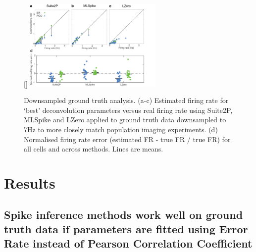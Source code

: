 \documentclass[a4paper,10pt,twocolumn]{article}
\begin{document}
\begin{figure}
[\FBwidth]
{\includegraphics[trim={0 0 25 0},clip,width=0.6\textwidth]{full_figs/why_deconvolve_F1_2.png}}
{\caption{Downsampled ground truth analysis. (a-c) Estimated firing rate for `best' deconvolution parameters versus real firing rate using Suite2P, MLSpike and LZero applied to ground truth data downsampled to 7Hz to more closely match population imaging experiments. (d) Normalised firing rate error (estimated FR - true FR / true FR) for all cells and across methods. Lines are means. 
\label{fig:GT_data_ds}}}
\end{figure}



\section{Results} 
\subsection{Spike inference methods work well on ground truth data if parameters are fitted using Error Rate instead of Pearson Correlation Coefficient}\label{GT}

%
%
%
%
\end{document}
